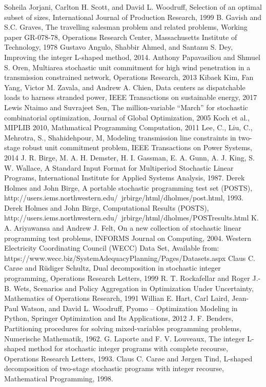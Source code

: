 \begin{thebibliography}{9}
	Soheila Jorjani, Carlton H. Scott, and David L. Woodruff, Selection of an optimal subset of sizes, International Journal of Production Research, 1999	
	B. Gavish and S.C. Graves, The travelling salesman problem and related problems, Working paper GR-078-78, Operations Research Center, Massachusetts Institute of Technology, 1978
	Gustavo Angulo, Shabbir Ahmed, and Santanu S. Dey, Improving the integer L-shaped method, 2014.
	Anthony Papavasiliou and Shmuel S. Oren, Multiarea stochastic unit commitment for high wind penetration in a transmission constrained network, Operations Research, 2013
	Kibaek Kim, Fan Yang, Victor M. Zavala, and Andrew A. Chien, Data centers as dispatchable loads to harness stranded power, IEEE Transactions on sustainable energy, 2017
	Lewis Ntaimo and Suvrajeet Sen, The million-variable ``March'' for stochastic combinatorial optimization, Journal of Global Optimization, 2005
	Koch et al., MIPLIB 2010, Mathmatical Programming Computation, 2011
	Lee, C., Liu, C., Mehrotra, S., Shahidehpour, M, Modeling transmission line constraints in two-stage robust unit commitment problem, IEEE Transactions on Power Systems, 2014
	J. R. Birge, M. A. H. Demster, H. I. Gassman, E. A. Gunn, A. J. King, S. W. Wallace, A Standard Input Format for Multiperiod Stochastic Linear Programs, International Institute for Applied Systems Analysis, 1987.
	Derek Holmes and John Birge, A portable stochastic programming test set (POSTS), http://users.iems.northwestern.edu/~jrbirge/html/dholmes/post.html, 1993.
	Derek Holmes and John Birge, Computational Results (POSTS), http://users.iems.northwestern.edu/~jrbirge/html/dholmes/POSTresults.html
	K. A. Ariyawansa and Andrew J. Felt, On a new collection of stochastic linear programming test problems, INFORMS Journal on Computing, 2004.
    Western Electricity Coordinating Council (WECC) Data Set, Available from: https://www.wecc.biz/SystemAdequacyPlanning/Pages/Datasets.aspx 
    Claus C. Car\o e and Rüdiger Schultz, Dual decomposition in stochastic integer programming, Operations Research Letters, 1999
    R. T. Rockafellar and Roger J.-B. Wets, Scenarios and Policy Aggregation in Optimization Under Uncertainty, Mathematics of Operations Research, 1991
    Willian E. Hart, Carl Laird, Jean-Paul Watson, and David L. Woodruff, Pyomo – Optimization Modeling in Python, Springer Optimization and Its Applications, 2012
    J. F. Benders, Partitioning procedures for solving mixed-variables programming problems, Numerische Mathematik, 1962.
	G. Laporte and F. V. Louveaux, The integer L-shaped method for stochastic integer programs with complete recourse, Operations Research Letters, 1993.
	Claus C. Car\o e and J\o rgen Tind, L-shaped decomposition of two-stage stochastic programs with integer recourse, Mathematical Programming, 1998.
\end{thebibliography}